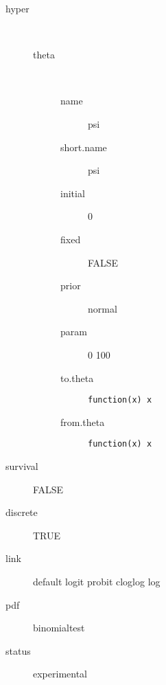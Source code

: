 \begin{description}
	\item[hyper]\ 
	 \begin{description}
	 	\item[theta]\ 
	 	 \begin{description}
	 	 	 \item[ name ] psi 
	 	 	 \item[ short.name ] psi 
	 	 	 \item[ initial ] 0 
	 	 	 \item[ fixed ] FALSE 
	 	 	 \item[ prior ] normal 
	 	 	 \item[ param ] 0 100 
	 	 	 \item[ to.theta ] \verb|function(x) x| 
	 	 	 \item[ from.theta ] \verb|function(x) x| 
	 	 \end{description}
	 \end{description}
	 \item[ survival ] FALSE 
	 \item[ discrete ] TRUE 
	 \item[ link ] default logit probit cloglog log 
	 \item[ pdf ] binomialtest 
	 \item[ status ] experimental 
\end{description}

